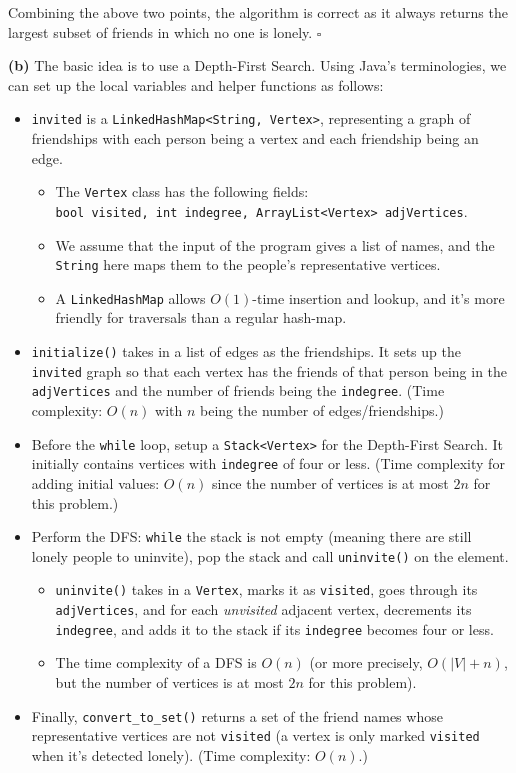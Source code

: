 \documentclass{article}
\begin{document}
\begin{enumerate}
    Combining the above two points, the algorithm is correct as it always returns the largest subset of friends in which no one is lonely. $\square$

    \textbf{(b)} The basic idea is to use a Depth-First Search. Using Java's terminologies, we can set up the local variables and helper functions as follows:
    \begin{itemize}
      \item \texttt{invited} is a \texttt{LinkedHashMap<String, Vertex>}, representing a graph of friendships with each person being a vertex and each friendship being an edge.
        \begin{itemize}
          \item The \texttt{Vertex} class has the following fields:\\
            \texttt{bool visited, int indegree, ArrayList<Vertex> adjVertices}.
          \item We assume that the input of the program gives a list of names, and the \texttt{String} here maps them to the people's representative vertices.
          \item A \texttt{LinkedHashMap} allows $O(1)$-time insertion and lookup, and it's more friendly for traversals than a regular hash-map.
        \end{itemize}
      \item \texttt{initialize()} takes in a list of edges as the friendships. It sets up the \texttt{invited} graph so that each vertex has the friends of that person being in the \texttt{adjVertices} and the number of friends being the \texttt{indegree}. (Time complexity: $O(n)$ with $n$ being the number of edges/friendships.)
      \item Before the \texttt{while} loop, setup a \texttt{Stack<Vertex>} for the Depth-First Search. It initially contains vertices with \texttt{indegree} of four or less. (Time complexity for adding initial values: $O(n)$ since the number of vertices is at most $2n$ for this problem.)
      \item Perform the DFS: \texttt{while} the stack is not empty (meaning there are still lonely people to uninvite), pop the stack and call \texttt{uninvite()} on the element.
        \begin{itemize}
          \item \texttt{uninvite()} takes in a \texttt{Vertex}, marks it as \texttt{visited}, goes through its \texttt{adjVertices}, and for each \textit{unvisited} adjacent vertex, decrements its \texttt{indegree}, and adds it to the stack if its \texttt{indegree} becomes four or less.
          \item The time complexity of a DFS is $O(n)$ (or more precisely, $O(|V| + n)$, but the number of vertices is at most $2n$ for this problem).
        \end{itemize}
      \item Finally, \texttt{convert\_to\_set()} returns a set of the friend names whose representative vertices are not \texttt{visited} (a vertex is only marked \texttt{visited} when it's detected lonely). (Time complexity: $O(n)$.)
    \end{itemize}


\end{enumerate}
\end{document}
